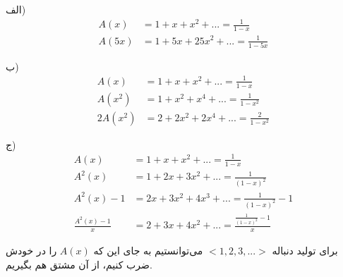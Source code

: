الف)
\begin{align*}
    A(x) &= 1 + x + x^2 + ... = \frac{1}{1 - x}\\
    A(5x) &= 1 + 5x + 25x^2 + ... = \frac{1}{1 - 5x}
\end{align*}

ب)
\begin{align*}
    A(x) &= 1 + x + x^2 + ... = \frac{1}{1 - x}\\
    A(x^2) &= 1 + x^2 + x^4 + ... = \frac{1}{1 - x^2}\\
    2A(x^2) &= 2 + 2x^2 + 2x^4 + ... = \frac{2}{1 - x^2}     
\end{align*}

ج)
\begin{align*}
    A(x) &= 1 + x + x^2 + ... = \frac{1}{1 - x}\\
    A^2(x) &= 1 + 2x + 3x^2 + ... = \frac{1}{(1 - x)^2}\\ 
    A^2(x) - 1 &= 2x + 3x^2 + 4x^3 + ... = \frac{1}{(1 - x)^2} - 1\\
    \frac{A^2(x) - 1}{x} &= 2 + 3x + 4x^2 + ... = \frac{\frac{1}{(1 - x)^2} - 1}{x}
\end{align*}

برای تولید دنباله 
$<1, 2, 3, ...>$
می‌توانستیم به جای این که $A(x)$ را در خودش ضرب کنیم، از آن مشتق هم بگیریم.